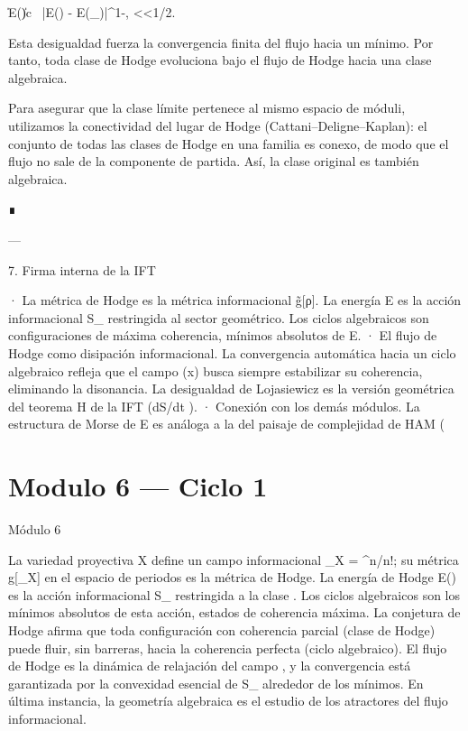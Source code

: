 \documentclass[12pt,twoside]{book}
\begin{document}
\|\nabla E(\alpha)\| \ge c \, |E(\alpha) - E(\alpha_\infty)|^{1-\theta}, <\theta<1/2.

Esta desigualdad fuerza la convergencia finita del flujo hacia un mínimo. Por tanto, toda clase de Hodge evoluciona bajo el flujo de Hodge hacia una clase algebraica.

Para asegurar que la clase límite pertenece al mismo espacio de móduli, utilizamos la conectividad del lugar de Hodge (Cattani–Deligne–Kaplan): el conjunto de todas las clases de Hodge en una familia es conexo, de modo que el flujo no sale de la componente de partida. Así, la clase original \alpha es también algebraica.

∎

---

7. Firma interna de la IFT

· La métrica de Hodge es la métrica informacional g̃[ρ]. La energía E es la acción informacional S_{} restringida al sector geométrico. Los ciclos algebraicos son configuraciones de máxima coherencia, mínimos absolutos de E.
· El flujo de Hodge como disipación informacional. La convergencia automática hacia un ciclo algebraico refleja que el campo \rho(x) busca siempre estabilizar su coherencia, eliminando la disonancia. La desigualdad de Lojasiewicz es la versión geométrica del teorema H de la IFT (dS/dt ).
· Conexión con los demás módulos. La estructura de Morse de E es análoga a la del paisaje de complejidad de HAM (

\chapter{Modulo 6 — Ciclo 1}
Módulo 6

La variedad proyectiva X define un campo informacional \rho_X = \omega^n/n!; su métrica g[\rho_X] en el espacio de periodos es la métrica de Hodge. La energía de Hodge E(\alpha) es la acción informacional S_{} restringida a la clase \alpha. Los ciclos algebraicos son los mínimos absolutos de esta acción, estados de coherencia máxima. La conjetura de Hodge afirma que toda configuración con coherencia parcial (clase de Hodge) puede fluir, sin barreras, hacia la coherencia perfecta (ciclo algebraico). El flujo de Hodge es la dinámica de relajación del campo \rho, y la convergencia está garantizada por la convexidad esencial de S_{} alrededor de los mínimos. En última instancia, la geometría algebraica es el estudio de los atractores del flujo informacional.
\end{document}

